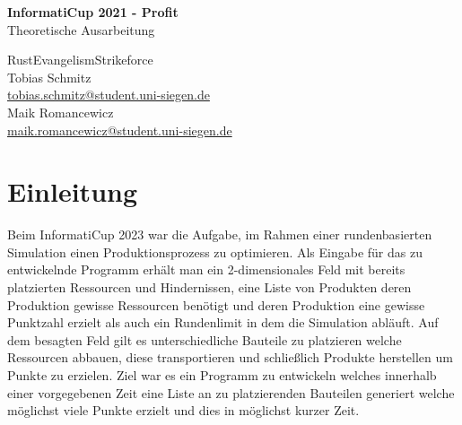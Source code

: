 \documentclass[12pt,a4paper]{article}
\newcommand{\HRule}{\rule{\linewidth}{0.5mm}}
\begin{document}
\begin{titlepage}
\begin{center}


\vspace*{2cm}
{ \LARGE 
  \textbf{InformatiCup 2021 - Profit}\\[0.4cm]
  Theoretische Ausarbeitung\\
}
\vspace*{2cm}

{ \large
  RustEvangelismStrikeforce\\
    \vspace*{1cm}
  Tobias Schmitz \\ \href{tobias.schmitz@student.uni-siegen.de}{tobias.schmitz@student.uni-siegen.de} \\
  Maik Romancewicz \\ \href{tobias.schmitz@student.uni-siegen.de}{maik.romancewicz@student.uni-siegen.de} \\
}
\vfill



 
\end{center}
\end{titlepage}

\newpage

\tableofcontents
\thispagestyle{empty}
\newpage

\thispagestyle{empty}
\newpage

\setcounter{page}{1}

\section{Einleitung}
Beim InformatiCup 2023 war die Aufgabe, im Rahmen einer rundenbasierten Simulation einen Produktionsprozess zu optimieren. Als Eingabe für das zu entwickelnde Programm erhält man ein 2-dimensionales Feld mit bereits platzierten Ressourcen und Hindernissen, eine Liste von Produkten deren Produktion gewisse Ressourcen benötigt und deren Produktion eine gewisse Punktzahl erzielt als auch ein Rundenlimit in dem die Simulation abläuft. Auf dem besagten Feld gilt es unterschiedliche Bauteile zu platzieren welche Ressourcen abbauen, diese transportieren und schließlich Produkte herstellen um Punkte zu erzielen. Ziel war es ein Programm zu entwickeln welches innerhalb einer vorgegebenen Zeit eine Liste an zu platzierenden Bauteilen generiert welche möglichst viele Punkte erzielt und dies in möglichst kurzer Zeit.
\end{document}
